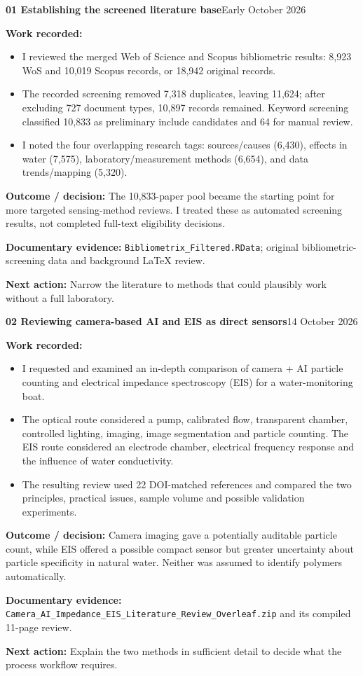 \documentclass[11pt,a4paper]{article}
\newcommand{\logentry}[3]{%
  \Needspace{13\baselineskip}%
  \vspace{8pt}%
  {\large\bfseries\color{ink}#1 \quad #2}\hfill{\small\color{ink}#3}\par
  \vspace{-3pt}{\color{linecolor}\rule{\linewidth}{.6pt}}\par\vspace{1pt}%
}
\newcommand{\result}[1]{\textbf{Outcome / decision:} #1\par}
\newcommand{\evidence}[1]{\textbf{Documentary evidence:} {\small #1}\par}
\newcommand{\nextstep}[1]{\textbf{Next action:} #1\par}
\begin{document}
\logentry{01}{Establishing the screened literature base}{Early October 2026}
\textbf{Work recorded:}
\begin{itemize}
\item I reviewed the merged Web of Science and Scopus bibliometric results: 8,923 WoS and 10,019 Scopus records, or 18,942 original records.
\item The recorded screening removed 7,318 duplicates, leaving 11,624; after excluding 727 document types, 10,897 records remained. Keyword screening classified 10,833 as preliminary include candidates and 64 for manual review.
\item I noted the four overlapping research tags: sources/causes (6,430), effects in water (7,575), laboratory/measurement methods (6,654), and data trends/mapping (5,320).
\end{itemize}
\result{The 10,833-paper pool became the starting point for more targeted sensing-method reviews. I treated these as automated screening results, not completed full-text eligibility decisions.}
\evidence{\texttt{Bibliometrix\_Filtered.RData}; original bibliometric-screening data and background LaTeX review.}
\nextstep{Narrow the literature to methods that could plausibly work without a full laboratory.}

\logentry{02}{Reviewing camera-based AI and EIS as direct sensors}{14 October 2026}
\textbf{Work recorded:}
\begin{itemize}
\item I requested and examined an in-depth comparison of camera + AI particle counting and electrical impedance spectroscopy (EIS) for a water-monitoring boat.
\item The optical route considered a pump, calibrated flow, transparent chamber, controlled lighting, imaging, image segmentation and particle counting. The EIS route considered an electrode chamber, electrical frequency response and the influence of water conductivity.
\item The resulting review used 22 DOI-matched references and compared the two principles, practical issues, sample volume and possible validation experiments.
\end{itemize}
\result{Camera imaging gave a potentially auditable particle count, while EIS offered a possible compact sensor but greater uncertainty about particle specificity in natural water. Neither was assumed to identify polymers automatically.}
\evidence{\texttt{Camera\_AI\_Impedance\_EIS\_Literature\_Review\_Overleaf.zip} and its compiled 11-page review.}
\nextstep{Explain the two methods in sufficient detail to decide what the process workflow requires.}
\end{document}
